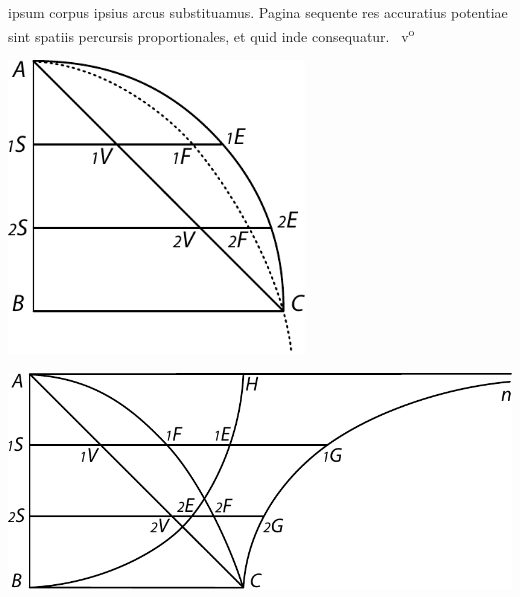 ipsum corpus ipsius arcus\protect{} substituamus.
Pagina sequente\protect{} res accuratius
potentiae\protect{} sint
spatiis percursis\protect{} proportionales,
et quid inde consequatur.
%
~v\textsuperscript{o}\rbrack%
%
\pend%
\vspace{2.0em} 
\pstart\noindent
\begin{minipage}[t][3.8cm][c]{0.5\textwidth}
\includegraphics[width=0.59\textwidth]{gesamttex/edit_VIII,3/images/LH_35_10_08_019_d3.pdf}
\end{minipage}
\hspace{-10mm}
\begin{minipage}[t][3.45cm][c]{0.5\textwidth}
\includegraphics[width=1.1\textwidth]{gesamttex/edit_VIII,3/images/LH_35_10_08_019_d4a.pdf}
\end{minipage}
\\
